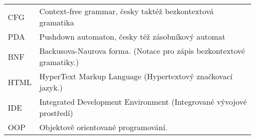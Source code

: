 
\seznamzkr

\begin{tabular}{ll}
	CFG & Context-free grammar, česky taktéž bezkontextová gramatika \\
	PDA & Pushdown automaton, česky též zásobníkový automat \\
	BNF & Backusova-Naurova forma. (Notace pro zápis bezkontextové gramatiky.) \\
	HTML & HyperText Markup Language (Hypertextový značkovací jazyk.) \\
	IDE & Integrated Development Environment (Integrované vývojové prostředí) \\
	OOP & Objektově orientované programování. \\
\end{tabular}

